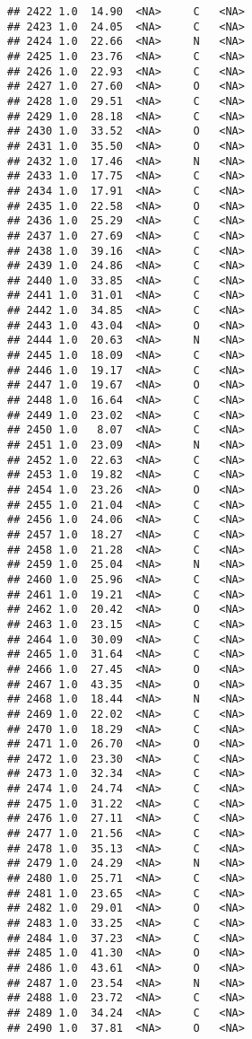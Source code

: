 \documentclass[
]{article}
\begin{document}
\begin{verbatim}
## 2422 1.0  14.90  <NA>     C   <NA>
## 2423 1.0  24.05  <NA>     C   <NA>
## 2424 1.0  22.66  <NA>     N   <NA>
## 2425 1.0  23.76  <NA>     C   <NA>
## 2426 1.0  22.93  <NA>     C   <NA>
## 2427 1.0  27.60  <NA>     O   <NA>
## 2428 1.0  29.51  <NA>     C   <NA>
## 2429 1.0  28.18  <NA>     C   <NA>
## 2430 1.0  33.52  <NA>     O   <NA>
## 2431 1.0  35.50  <NA>     O   <NA>
## 2432 1.0  17.46  <NA>     N   <NA>
## 2433 1.0  17.75  <NA>     C   <NA>
## 2434 1.0  17.91  <NA>     C   <NA>
## 2435 1.0  22.58  <NA>     O   <NA>
## 2436 1.0  25.29  <NA>     C   <NA>
## 2437 1.0  27.69  <NA>     C   <NA>
## 2438 1.0  39.16  <NA>     C   <NA>
## 2439 1.0  24.86  <NA>     C   <NA>
## 2440 1.0  33.85  <NA>     C   <NA>
## 2441 1.0  31.01  <NA>     C   <NA>
## 2442 1.0  34.85  <NA>     C   <NA>
## 2443 1.0  43.04  <NA>     O   <NA>
## 2444 1.0  20.63  <NA>     N   <NA>
## 2445 1.0  18.09  <NA>     C   <NA>
## 2446 1.0  19.17  <NA>     C   <NA>
## 2447 1.0  19.67  <NA>     O   <NA>
## 2448 1.0  16.64  <NA>     C   <NA>
## 2449 1.0  23.02  <NA>     C   <NA>
## 2450 1.0   8.07  <NA>     C   <NA>
## 2451 1.0  23.09  <NA>     N   <NA>
## 2452 1.0  22.63  <NA>     C   <NA>
## 2453 1.0  19.82  <NA>     C   <NA>
## 2454 1.0  23.26  <NA>     O   <NA>
## 2455 1.0  21.04  <NA>     C   <NA>
## 2456 1.0  24.06  <NA>     C   <NA>
## 2457 1.0  18.27  <NA>     C   <NA>
## 2458 1.0  21.28  <NA>     C   <NA>
## 2459 1.0  25.04  <NA>     N   <NA>
## 2460 1.0  25.96  <NA>     C   <NA>
## 2461 1.0  19.21  <NA>     C   <NA>
## 2462 1.0  20.42  <NA>     O   <NA>
## 2463 1.0  23.15  <NA>     C   <NA>
## 2464 1.0  30.09  <NA>     C   <NA>
## 2465 1.0  31.64  <NA>     C   <NA>
## 2466 1.0  27.45  <NA>     O   <NA>
## 2467 1.0  43.35  <NA>     O   <NA>
## 2468 1.0  18.44  <NA>     N   <NA>
## 2469 1.0  22.02  <NA>     C   <NA>
## 2470 1.0  18.29  <NA>     C   <NA>
## 2471 1.0  26.70  <NA>     O   <NA>
## 2472 1.0  23.30  <NA>     C   <NA>
## 2473 1.0  32.34  <NA>     C   <NA>
## 2474 1.0  24.74  <NA>     C   <NA>
## 2475 1.0  31.22  <NA>     C   <NA>
## 2476 1.0  27.11  <NA>     C   <NA>
## 2477 1.0  21.56  <NA>     C   <NA>
## 2478 1.0  35.13  <NA>     C   <NA>
## 2479 1.0  24.29  <NA>     N   <NA>
## 2480 1.0  25.71  <NA>     C   <NA>
## 2481 1.0  23.65  <NA>     C   <NA>
## 2482 1.0  29.01  <NA>     O   <NA>
## 2483 1.0  33.25  <NA>     C   <NA>
## 2484 1.0  37.23  <NA>     C   <NA>
## 2485 1.0  41.30  <NA>     O   <NA>
## 2486 1.0  43.61  <NA>     O   <NA>
## 2487 1.0  23.54  <NA>     N   <NA>
## 2488 1.0  23.72  <NA>     C   <NA>
## 2489 1.0  34.24  <NA>     C   <NA>
## 2490 1.0  37.81  <NA>     O   <NA>

\end{verbatim}
\end{document}
